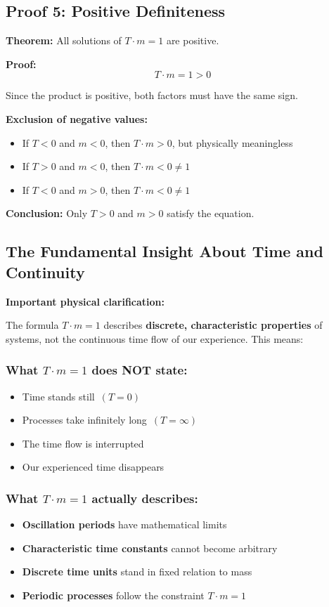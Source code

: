 	\subsection{Proof 5: Positive Definiteness}
	
	\textbf{Theorem:} All solutions of $T \cdot m = 1$ are positive.
	
	\textbf{Proof:}
	\begin{equation}
		T \cdot m = 1 > 0
	\end{equation}
	
	Since the product is positive, both factors must have the same sign.
	
	\textbf{Exclusion of negative values:}
	\begin{itemize}
		\item If $T < 0$ and $m < 0$, then $T \cdot m > 0$, but physically meaningless
		\item If $T > 0$ and $m < 0$, then $T \cdot m < 0 \neq 1$
		\item If $T < 0$ and $m > 0$, then $T \cdot m < 0 \neq 1$
	\end{itemize}
	
	\textbf{Conclusion:} Only $T > 0$ and $m > 0$ satisfy the equation.
	
	\subsection{The Fundamental Insight About Time and Continuity}
	
	\textbf{Important physical clarification:}
	
	The formula $T \cdot m = 1$ describes \textbf{discrete, characteristic properties} of systems, not the continuous time flow of our experience. This means:
	
	\subsubsection{What $T \cdot m = 1$ does NOT state:}
	\begin{itemize}
		\item \glqq Time stands still\grqq\ $(T = 0)$
		\item \glqq Processes take infinitely long\grqq\ $(T = \infty)$
		\item \glqq The time flow is interrupted\grqq
		\item \glqq Our experienced time disappears\grqq
	\end{itemize}
	
	\subsubsection{What $T \cdot m = 1$ actually describes:}
	\begin{itemize}
		\item \textbf{Oscillation periods} have mathematical limits
		\item \textbf{Characteristic time constants} cannot become arbitrary
		\item \textbf{Discrete time units} stand in fixed relation to mass
		\item \textbf{Periodic processes} follow the constraint $T \cdot m = 1$
	\end{itemize}
	
